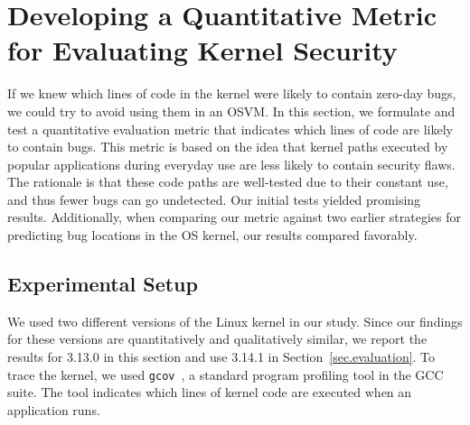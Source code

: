 \section{Developing a Quantitative Metric for Evaluating Kernel Security}
\label{sec.metric}

If we knew which lines of code in the kernel were likely to contain zero-day
bugs, we could try to avoid using them in an OSVM.  
In this section, we formulate and test a quantitative evaluation metric that
indicates which lines of code are likely to contain bugs.
This metric is based on the idea that kernel paths executed by popular 
applications
during everyday use are less likely to contain security flaws.
The rationale is that these code paths are well-tested due to their constant 
use, and thus fewer bugs can go undetected. 
Our initial tests yielded promising results. 
Additionally, when comparing our metric against two earlier strategies for predicting bug
locations in the OS kernel, our results compared favorably.

\subsection{Experimental Setup}\label{sec-setup}
We used two different versions of
the Linux kernel in our study.
Since our findings for these versions are quantitatively and qualitatively similar, we report
the results for 3.13.0 in this section and use 3.14.1 in Section~\ref{sec.evaluation}.
%
To trace the kernel, we used \texttt{gcov}~\cite{gcov}, a standard program profiling
tool in the GCC suite. The tool indicates which lines of kernel
code are executed when an application runs.

